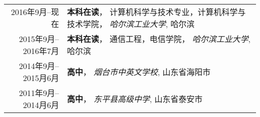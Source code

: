 %
%



\begin{tabular}{rl}	
	\textsc{2016年9月--现在 }		& \textbf{本科在读}， 计算机科学与技术专业，计算机科学与技术学院， \emph{哈尔滨工业大学}, 哈尔滨\\
	\textsc{2015年9月--2016年7月}	  & \textbf{本科在读}， 通信工程，电信学院， \emph{哈尔滨工业大学}, 哈尔滨\\
	\textsc{2014年9月--2015月6月} 	&  \textbf{高中}， \emph{烟台市中英文学校}, 山东省海阳市\\
	\textsc{2011年9月--2014月6月} 	&  \textbf{高中}， \emph{东平县高级中学}, 山东省泰安市\\	
\end{tabular}